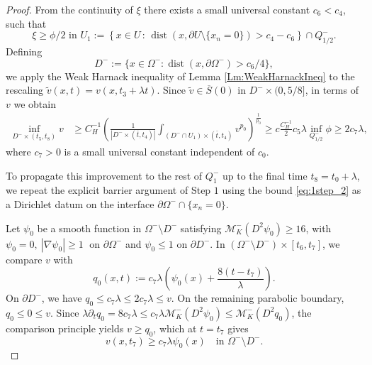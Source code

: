 \documentclass[12pt]{article}
\numberwithin{Theorem}{section}
\theoremstyle{definition}
\theoremstyle{remark}
\numberwithin{equation}{section}
\newcommand{\p}{\partial}
\begin{document}
\begin{proof}
From the continuity of $\xi$ there exists a small universal constant $c_6 < c_4$, such that 
$$
\xi \geq \phi/2 \text{ in } U_1:=\left\{ x \in U \, : \, \operatorname{dist}\!\left(x, \p U \setminus \{ x_n=0\}\right) > c_4-c_6 \right\} \cap Q_{1/2}^-.
$$
Defining 
\[
D^-:= \{ x \in \Omega^- : \operatorname{dist}(x,\p \Omega^-) > c_6/4\},
\]
we apply the Weak Harnack inequality of Lemma \ref{Lm:WeakHarnackIneq} to the rescaling $\tilde v(x,t)=v(x,t_3+\lambda t)$. Since $\tilde v \in \overline{S}(0)$ in $D^- \times (0,5/8]$, in terms of $v$ we obtain
\begin{align} \label{eq:est_in_D^-}
\inf_{D^- \times (t_5,t_8)} v &\geq C_H^{-1}\left( \frac{1}{|D^-\times (\bar t, t_4)|}\int_{ (D^- \cap U_1)\times(\bar t, t_4)} v^{p_0}\right)^\frac{1}{p_0} \geq  c\frac{C_H^{-1}}{2} c_5 \lambda \inf_{Q_{1/2}^-}\phi \geq 2 c_7 \lambda,
\end{align}
where $c_7>0$ is a small universal constant independent of $c_0$. 

To propagate this improvement to the rest of $Q_1^-$ up to the final time $t_8 = t_0 + \lambda$, we repeat the explicit barrier argument of Step $1$ using the bound \eqref{eq:1step_2} as a Dirichlet datum on the interface $ \p \Omega^- \cap \{ x_n=0\}$.

Let $\psi_0$ be a smooth function in $\Omega^- \setminus D^-$ satisfying $\mathcal M_K^- (D^2 \psi_0) \geq 16$, with $\psi_0 = 0, \ |\nabla \psi_0| \geq 1 \; \text{ on } \p \Omega^-$ and $\psi_0 \leq 1$ on $\p D^-$. 
In $(\Omega^- \setminus D^-) \times [t_6,t_7]$, we compare $v$ with
\[
q_0(x,t):= c_7\lambda \left( \psi_0(x) + \frac{8(t-t_7)}{\lambda}\right).
\]
On $\p D^-$, we have $q_0 \leq c_7\lambda \leq 2 c_7\lambda \leq v$.  On the remaining parabolic boundary, $q_0 \leq 0 \leq v$. Since $\lambda \p_t q_0 = 8 c_7 \lambda \leq c_7 \lambda \mathcal{M}_K^-(D^2 \psi_0) \leq \mathcal{M}_K^-(D^2 q_0)$, the comparison principle yields $v \geq q_0$, which at $t=t_7$ gives
\begin{equation} \label{eq:compare_v_q-}
    v(x,t_7) \geq c_7\lambda\psi_0(x) \quad \text{in } \Omega^- \setminus D^-.
\end{equation}


\end{proof}
\end{document}
